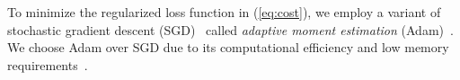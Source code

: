 
To minimize the regularized loss function in (\ref{eq:cost}), we employ a
variant of stochastic gradient descent (SGD)~\cite{bottou2010large}
called \textit{adaptive moment estimation}
(Adam)~\cite{kingma2014adam}. We choose Adam over SGD due to its computational efficiency and low memory requirements~\cite{kingma2014adam, anthimopoulos2016lung, arora2018optimization}.  

